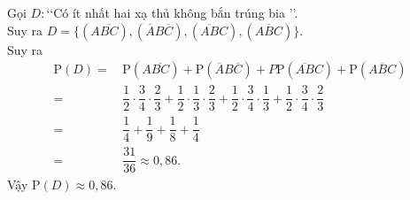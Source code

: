 \begin{bt}
{\begin{center}
	\end{center}
		Gọi $D:$\lq\lq Có ít nhất hai xạ thủ không bắn trúng bia \rq\rq.\\
		Suy ra $D=\{(A\overline{BC}), (\overline{A}B\overline{C}), (\overline{AB}C), (\overline{ABC})\}$.\\
		Suy ra 
		\begin{align*}
			\mathrm{P}(D)=&\, \mathrm{P}(A\overline{BC})+\mathrm{P}(\overline{A}B\overline{C})+P\mathrm{P}(\overline{AB}C)+\mathrm{P}(\overline{ABC})\\
			=&\, \dfrac{1}{2}\cdot\dfrac{3}{4}\cdot\dfrac{2}{3}+\dfrac{1}{2}\cdot\dfrac{1}{3}\cdot\dfrac{2}{3}+\dfrac{1}{2}\cdot\dfrac{3}{4}\cdot\dfrac{1}{3}+\dfrac{1}{2}\cdot\dfrac{3}{4}\cdot\dfrac{2}{3}\\
			=&\, \dfrac{1}{4}+\dfrac{1}{9}+\dfrac{1}{8}+\dfrac{1}{4}\\
			=&\, \dfrac{31}{36}\approx 0{,}86.
		\end{align*}
		Vậy $\mathrm{P}(D)\approx 0{,}86$.
	}
\end{bt}

